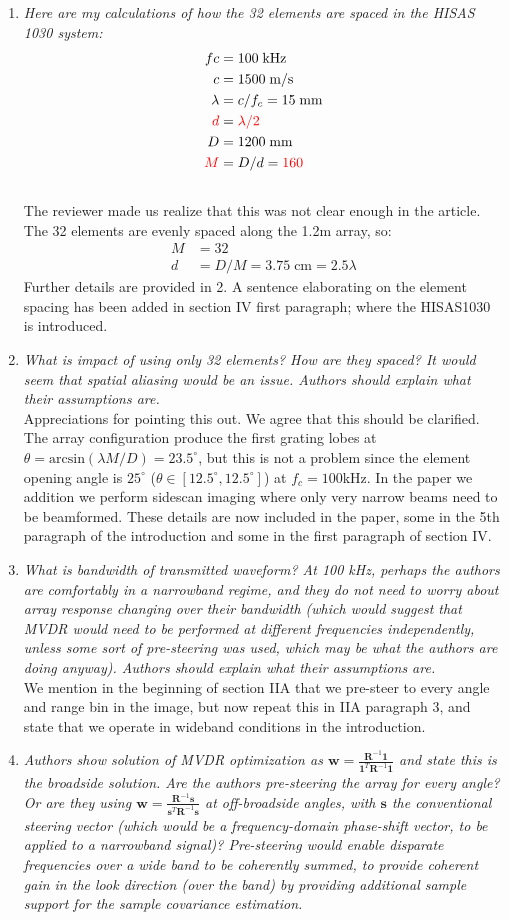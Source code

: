 \documentclass[11pt]{article} %
\newcommand\T{^{\scriptscriptstyle T}}
\renewcommand\vec[1]{\boldsymbol{#1}}
\newcommand\mat[1]{\boldsymbol{#1}}
\newcommand\1{\vec 1}
\newcommand*\s{\vec s}
\newcommand*\w{\vec w}
\newcommand*\R{\mat R}
\newcommand*\Ri{\R^{-1}}
\renewcommand*\t{^T}
\newcommand\q[1]{\textit{#1}}
\newcommand\qi[1]{\item\q{#1}}
\newcommand\ans[1]{#1}
\newcommand\ai[1]{\\[.5\baselineskip]\ans{#1}}
\begin{document}
\begin{enumerate}
\qi{Here are my calculations of how the 32 elements are spaced in the HISAS 1030 system:}
\begin{align}
fc &= 100\;\text{kHz} \\
c  &= 1500\;\text{m/s} \\
\lambda &= c/f_c = 15\;\text{mm} \\
\textcolor{red}{ d } &= \textcolor{red}{\lambda/2 } \\
D &= 1200\;\text{mm} \\
\textcolor{red}{M} &= D/d = \textcolor{red}{160}
\end{align}
\ai{The reviewer made us realize that this was not clear enough in the article. The 32 elements are evenly spaced along the 1.2m array, so:
\begin{align}
M &= 32 \\
d &= D / M = 3.75\;\text{cm} = 2.5\lambda
\end{align}
Further details are provided in 2. A sentence elaborating on the element spacing has been added in section IV first paragraph; where the HISAS1030 is introduced.}
%
\qi{What is impact of using only 32 elements? How are they spaced? It would seem that spatial aliasing would be an issue. Authors should explain what their assumptions are.}
\ai{Appreciations for pointing this out. We agree that this should be clarified. The array configuration produce the first grating lobes at $\theta = \text{arcsin}(\lambda M/D) = 23.5^\circ$, but this is not a problem since the element opening angle is $25^\circ$ ($\theta\in[12.5^\circ,12.5^\circ]$) at $f_c=100$\;kHz. In the paper we addition we perform sidescan imaging where only very narrow beams need to be beamformed. These details are now included in the paper, some in the 5th paragraph of the introduction and some in the first paragraph of section IV.}
%
\qi{What is bandwidth of transmitted waveform? At 100 kHz, perhaps the authors are comfortably in a narrowband regime, and they do not need to worry about array response changing over their bandwidth (which would suggest that MVDR would need to be performed at different frequencies independently, unless some sort of pre-steering was used, which may be what the authors are doing anyway). Authors should explain what their assumptions are.}
\ai{We mention in the beginning of section IIA that we pre-steer to every angle and range bin in the image, but now repeat this in IIA paragraph 3, and state that we operate in wideband conditions in the introduction.}
%
\qi{Authors show solution of MVDR optimization as $\w = \frac{\Ri\1}{\1\T\Ri\1}$ and state this is the broadside solution. Are the authors pre-steering the array for every angle? Or are they using $\w = \frac{\Ri\s}{\s\t\Ri\s}$ at off-broadside angles, with $\s$ the conventional steering vector (which would be a frequency-domain phase-shift vector, to be applied to a narrowband signal)? Pre-steering would enable disparate frequencies over a wide band to be coherently summed, to provide coherent gain in the look direction (over the band) by providing additional sample support for the sample covariance estimation.}

\end{enumerate}
\end{document}
